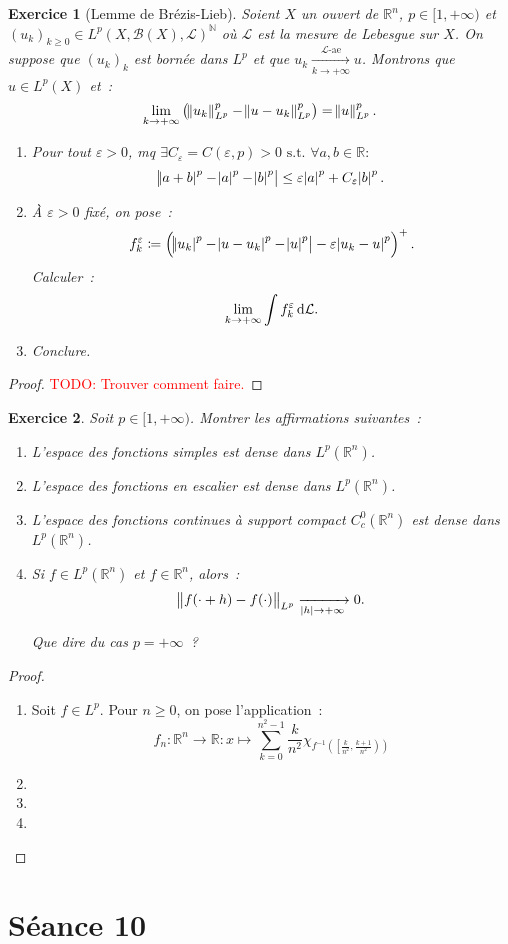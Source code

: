 \documentclass{article}
\newtheorem{ex}{Exercice}[section]
\theoremstyle{definition}
\newcommand{\TODO}[1]{\textcolor{red}{TODO: #1}}
\newcommand{\pinfty}{{+\infty}}
\newcommand{\st}{\text{ s.t. }}
\newcommand{\N}{{\mathbb N}}
\newcommand{\R}{{\mathbb R}}
\begin{document}
\begin{ex}[Lemme de Brézis-Lieb] Soient $X$ un ouvert de $\R^n$, $p \in [1, \pinfty)$ et $(u_k)_{k \geq 0} \in {L^p(X, \mathcal B(X), \mathcal L)}^\N$ où $\mathcal L$
est la mesure de Lebesgue sur $X$. On suppose que $(u_k)_k$ est bornée dans $L^p$ et que $u_k \xrightarrow[k \to \pinfty]{\mathcal L\text{-ae}} u$.
Montrons que $u \in L^p(X)$ et~:
\[\lim_{k \to \pinfty}\left(\norm {u_k}_{L^p}^p - \norm {u-u_k}_{L^p}^p\right) = \norm u_{L^p}^p.\]

\begin{enumerate}
	\item Pour tout $\varepsilon > 0$, mq $\exists C_\varepsilon = C(\varepsilon, p) > 0 \st \forall a, b \in \R :$
	\[\abs {\abs {a+b}^p - \abs a^p - \abs b^p} \leq \varepsilon\abs a^p + C_\varepsilon\abs b^p.\]

	\item À $\varepsilon > 0$ fixé, on pose~:
	\[f_k^\varepsilon \coloneqq \left(\abs {\abs {u_k}^p - \abs {u-u_k}^p - \abs u^p} - \varepsilon\abs {u_k-u}^p\right)^+.\]
	Calculer~:
	\[\lim_{k \to \pinfty}\int f_k^\varepsilon\dif\mathcal L.\]

	\item Conclure.
\end{enumerate}
\end{ex}

\begin{proof}
	\TODO{Trouver comment faire.}
\end{proof}

\begin{ex} Soit $p \in [1, \pinfty)$. Montrer les affirmations suivantes~:
\begin{enumerate}
	\item L'espace des fonctions simples est dense dans $L^p(\R^n)$.
	\item L'espace des fonctions en escalier est dense dans $L^p(\R^n)$.
	\item L'espace des fonctions continues à support compact $C^0_c(\R^n)$ est dense dans $L^p(\R^n)$.
	\item Si $f \in L^p(\R^n)$ et $f \in \R^n$, alors~:
	\[\norm {f(\cdot+h)-f(\cdot)}_{L^p} \xrightarrow[\abs h \to \pinfty]{} 0.\]

	Que dire du cas $p = \pinfty$~?
\end{enumerate}
\end{ex}

\begin{proof}~
\begin{enumerate}
	\item Soit $f \in L^p$. Pour $n \geq 0$, on pose l'application~:
	\[f_n : \R^n \to \R : x \mapsto \sum_{k=0}^{n^2-1}\frac k{n^2}\chi_{f^{-1}\left(\left[\frac k{n^2}, \frac {k+1}{n^2}\right)\right)}\]
	\item
	\item
	\item
\end{enumerate}
\end{proof}

\newpage
\section{Séance 10}
\end{document}
